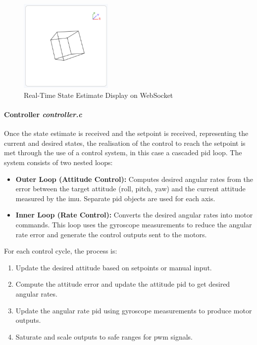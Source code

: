 \begin{figure}[H]
    \centering
    \captionsetup{justification=centering, margin=1cm}
    \includegraphics[width=0.4\textwidth]{img/websocket-state.PNG}
    \caption{Real-Time State Estimate Display on WebSocket}
    \label{fig:ws-state}
\end{figure}

\paragraph{\textbf{Controller} \textit{controller.c}} \leavevmode 

Once the state estimate is received and the setpoint is received, representing the current and desired states, the realisation of the control to reach the setpoint is met through the use of a control system, in this case a cascaded \gls{pid} loop. The system consists of two nested loops:

\begin{itemize}
    \item \textbf{Outer Loop (Attitude Control):} Computes desired angular rates from the error between the target attitude (roll, pitch, yaw) and the current attitude measured by the \gls{imu}. Separate \gls{pid} objects are used for each axis.
    \item \textbf{Inner Loop (Rate Control):} Converts the desired angular rates into motor commands. This loop uses the gyroscope measurements to reduce the angular rate error and generate the control outputs sent to the motors.
\end{itemize}

For each control cycle, the process is:

\begin{enumerate}
    \item Update the desired attitude based on setpoints or manual input.
    \item Compute the attitude error and update the attitude \gls{pid} to get desired angular rates.
    \item Update the angular rate \gls{pid} using gyroscope measurements to produce motor outputs.
    \item Saturate and scale outputs to safe ranges for \gls{pwm} signals.
\end{enumerate}


